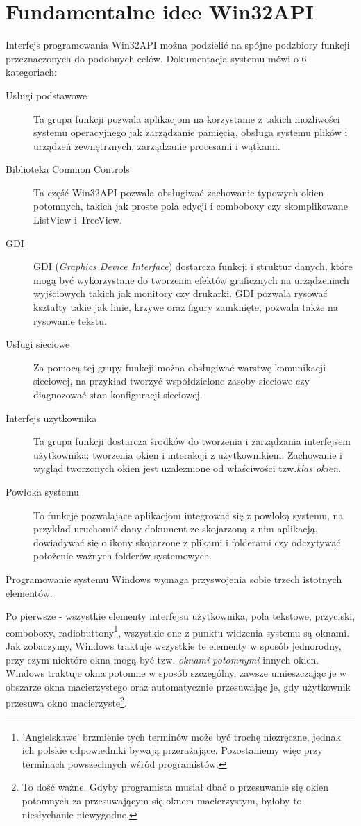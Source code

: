 ﻿\section{Fundamentalne idee Win32API}

Interfejs programowania Win32API można podzielić na spójne podzbiory funkcji przeznaczonych
do podobnych celów. Dokumentacja systemu mówi o 6 kategoriach:

\begin{description}
\item[Usługi podstawowe] Ta grupa funkcji pozwala aplikacjom na korzystanie z takich możliwości
systemu operacyjnego jak zarządzanie pamięcią, obsługa systemu plików i urządzeń zewnętrznych,
zarządzanie procesami i wątkami.
\item[Biblioteka Common Controls]Ta część Win32API pozwala obsługiwać zachowanie typowych
okien potomnych, takich jak proste pola edycji i comboboxy czy skomplikowane ListView i TreeView.
\item[GDI]GDI ({\em Graphics Device Interface}) dostarcza funkcji i struktur danych, które
mogą być wykorzystane do tworzenia efektów graficznych na urządzeniach wyjściowych takich jak
monitory czy drukarki. GDI pozwala rysować kształty takie jak linie, krzywe oraz figury zamknięte,
pozwala także na rysowanie tekstu.
\item[Usługi sieciowe]Za pomocą tej grupy funkcji można obsługiwać warstwę komunikacji sieciowej, na
przykład tworzyć współdzielone zasoby sieciowe czy diagnozować stan konfiguracji sieciowej.
\item[Interfejs użytkownika]Ta grupa funkcji dostarcza środków do tworzenia i zarządzania interfejsem
użytkownika: tworzenia okien i interakcji z użytkownikiem. Zachowanie i wygląd tworzonych okien jest 
uzależnione od właściwości tzw.{\em klas okien}. 
\item[Powłoka systemu]To funkcje pozwalające aplikacjom integrować się z powłoką systemu, na przykład
uruchomić dany dokument ze skojarzoną z nim aplikacją, dowiadywać się o ikony skojarzone z plikami i
folderami czy odczytywać położenie ważnych folderów systemowych.
\end{description}

Programowanie systemu Windows wymaga przyswojenia sobie trzech istotnych elementów.

Po pierwsze - wszystkie elementy interfejsu użytkownika, pola tekstowe, przyciski,
comboboxy, radiobuttony\footnote{'Angielskawe' brzmienie tych terminów może być
trochę niezręczne, jednak ich polskie odpowiedniki bywają przerażające. Pozostaniemy
więc przy terminach powszechnych wśród programistów.}, 
wszystkie one z punktu widzenia systemu są oknami. Jak zobaczymy,
Windows traktuje wszystkie te elementy w sposób jednorodny, przy czym niektóre okna mogą być tzw.
{\em oknami potomnymi} innych okien. Windows traktuje okna potomne w sposób szczególny, zawsze
umieszczając je w obszarze okna macierzystego oraz automatycznie przesuwając je, gdy użytkownik
przesuwa okno macierzyste\footnote{To dość ważne. Gdyby programista musiał dbać o przesuwanie się
okien potomnych za przesuwającym się oknem macierzystym, byłoby to niesłychanie niewygodne.}.

